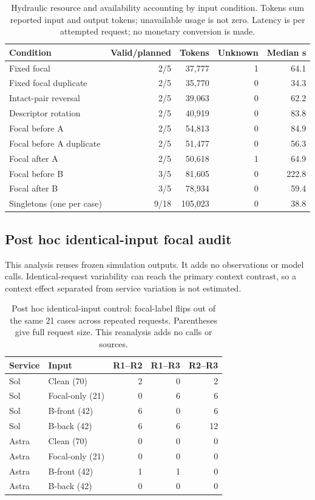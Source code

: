 \documentclass[11pt,a4paper]{article}
\begin{document}
\begin{table}[htbp]\centering\small
\caption{Hydraulic resource and availability accounting by input condition. Tokens sum reported input and output tokens; unavailable usage is not zero. Latency is per attempted request; no monetary conversion is made.}
\label{tab:hydraulic_resources}
\begin{tabular}{@{}lrrrr@{}}\toprule
Condition & Valid/planned & Tokens & Unknown & Median s \\\midrule
Fixed focal & 2/5 & 37,777 & 1 & 64.1 \\
Fixed focal duplicate & 2/5 & 35,770 & 0 & 34.3 \\
Intact-pair reversal & 2/5 & 39,063 & 0 & 62.2 \\
Descriptor rotation & 2/5 & 40,919 & 0 & 83.8 \\
Focal before A & 2/5 & 54,813 & 0 & 84.9 \\
Focal before A duplicate & 2/5 & 51,477 & 0 & 56.3 \\
Focal after A & 2/5 & 50,618 & 1 & 64.9 \\
Focal before B & 3/5 & 81,605 & 0 & 222.8 \\
Focal after B & 3/5 & 78,934 & 0 & 59.4 \\
Singletons (one per case) & 9/18 & 105,023 & 0 & 38.8 \\
\bottomrule\end{tabular}\end{table}

\subsection{Post hoc identical-input focal audit}
This analysis reuses frozen simulation outputs. It adds no observations or model calls. Identical-request variability can reach the primary context contrast, so a context effect separated from service variation is not estimated.

\begin{table}[htbp]\centering\small
\caption{Post hoc identical-input control: focal-label flips out of the same 21 cases across repeated requests. Parentheses give full request size. This reanalysis adds no calls or sources.}
\label{tab:repeat_control}
\begin{tabular}{@{}llrrr@{}}\toprule
Service & Input & R1--R2 & R1--R3 & R2--R3 \\\midrule
Sol & Clean (70) & 2 & 0 & 2 \\
Sol & Focal-only (21) & 0 & 6 & 6 \\
Sol & B-front (42) & 6 & 0 & 6 \\
Sol & B-back (42) & 6 & 6 & 12 \\
Astra & Clean (70) & 0 & 0 & 0 \\
Astra & Focal-only (21) & 0 & 0 & 0 \\
Astra & B-front (42) & 1 & 1 & 0 \\
Astra & B-back (42) & 0 & 0 & 0 \\
\bottomrule\end{tabular}\end{table}
\FloatBarrier
\end{document}
